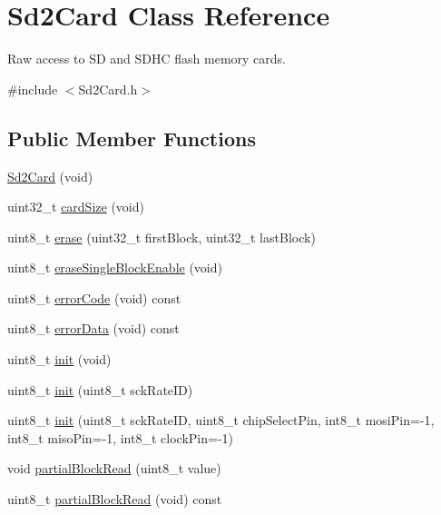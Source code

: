 \hypertarget{class_sd2_card}{}\section{Sd2\+Card Class Reference}
\label{class_sd2_card}


Raw access to SD and S\+D\+HC flash memory cards.  




{\ttfamily \#include $<$Sd2\+Card.\+h$>$}

\subsection*{Public Member Functions}
\begin{DoxyCompactItemize}
\item 
\hyperlink{class_sd2_card_af85a5ec4f5f4ec89deb8936c3fd7de65}{Sd2\+Card} (void)
\item 
uint32\+\_\+t \hyperlink{class_sd2_card_a862473431cc314238bfccdc531a70d3a}{card\+Size} (void)
\item 
uint8\+\_\+t \hyperlink{class_sd2_card_af49fb720fad1d3ea9f5782da0d87fc0b}{erase} (uint32\+\_\+t first\+Block, uint32\+\_\+t last\+Block)
\item 
uint8\+\_\+t \hyperlink{class_sd2_card_a2e3998f6e910a2936d3ef54bf082b2ce}{erase\+Single\+Block\+Enable} (void)
\item 
uint8\+\_\+t \hyperlink{class_sd2_card_adfa5b1a39875236dff591acbd560bfe7}{error\+Code} (void) const 
\item 
uint8\+\_\+t \hyperlink{class_sd2_card_a13fed56bd5bcfee862acb6de6924936c}{error\+Data} (void) const 
\item 
uint8\+\_\+t \hyperlink{class_sd2_card_afaec9a22060626b02c07a09eff2e9113}{init} (void)
\item 
uint8\+\_\+t \hyperlink{class_sd2_card_ad99b2d2156c9746065c52839ef679354}{init} (uint8\+\_\+t sck\+Rate\+ID)
\item 
uint8\+\_\+t \hyperlink{class_sd2_card_a204ef4cc35cc6e1d5f12a8cdd5f32518}{init} (uint8\+\_\+t sck\+Rate\+ID, uint8\+\_\+t chip\+Select\+Pin, int8\+\_\+t mosi\+Pin=-\/1, int8\+\_\+t miso\+Pin=-\/1, int8\+\_\+t clock\+Pin=-\/1)
\item 
void \hyperlink{class_sd2_card_aa279ac05b3f25acbf10cc424a25750da}{partial\+Block\+Read} (uint8\+\_\+t value)
\item 
uint8\+\_\+t \hyperlink{class_sd2_card_a73ad7fee10e05439f6ec832ce0eb196f}{partial\+Block\+Read} (void) const 
\item 

\end{DoxyCompactItemize}
